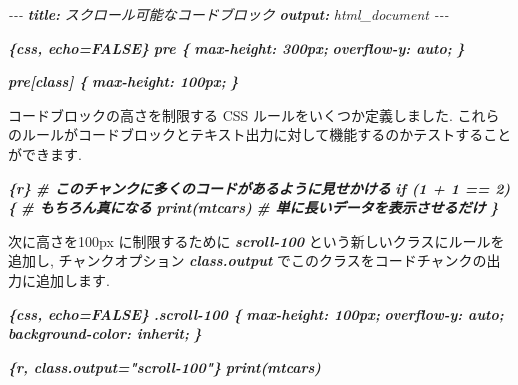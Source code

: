 \documentclass[
  11pt,
  lualatex,
  ja=standard]{bxjsreport}
\newenvironment{Shaded}{\begin{snugshade}}{\end{snugshade}}
\newcommand{\AnnotationTok}[1]{\textcolor[rgb]{0.56,0.35,0.01}{\textbf{\textit{#1}}}}
\newcommand{\CommentTok}[1]{\textcolor[rgb]{0.56,0.35,0.01}{\textit{#1}}}
\newcommand{\InformationTok}[1]{\textcolor[rgb]{0.56,0.35,0.01}{\textbf{\textit{#1}}}}
\newcommand{\NormalTok}[1]{#1}
\begin{document}
\begin{Shaded}
\begin{Highlighting}[]
\CommentTok{{-}{-}{-}}
\AnnotationTok{title:}\CommentTok{ スクロール可能なコードブロック}
\AnnotationTok{output:}\CommentTok{ html\_document}
\CommentTok{{-}{-}{-}}

\InformationTok{\textasciigrave{}\textasciigrave{}\textasciigrave{}\{css, echo=FALSE\}}
\InformationTok{pre \{}
\InformationTok{  max{-}height: 300px;}
\InformationTok{  overflow{-}y: auto;}
\InformationTok{\}}

\InformationTok{pre[class] \{}
\InformationTok{  max{-}height: 100px;}
\InformationTok{\}}
\InformationTok{\textasciigrave{}\textasciigrave{}\textasciigrave{}}

\NormalTok{コードブロックの高さを制限する CSS ルールをいくつか定義しました. これらのルールがコードブロックとテキスト出力に対して機能するのかテストすることができます.}

\InformationTok{\textasciigrave{}\textasciigrave{}\textasciigrave{}\{r\}}
\InformationTok{\# このチャンクに多くのコードがあるように見せかける}
\InformationTok{if (1 + 1 == 2) \{}
\InformationTok{  \# もちろん真になる}
\InformationTok{  print(mtcars)}
\InformationTok{  \# 単に長いデータを表示させるだけ}
\InformationTok{\}}
\InformationTok{\textasciigrave{}\textasciigrave{}\textasciigrave{}}

\NormalTok{次に高さを100px に制限するために }\InformationTok{\textasciigrave{}scroll{-}100\textasciigrave{}}\NormalTok{ という新しいクラスにルールを追加し,  チャンクオプション }\InformationTok{\textasciigrave{}class.output\textasciigrave{}}\NormalTok{ でこのクラスをコードチャンクの出力に追加します.}

\InformationTok{\textasciigrave{}\textasciigrave{}\textasciigrave{}\{css, echo=FALSE\}}
\InformationTok{.scroll{-}100 \{}
\InformationTok{  max{-}height: 100px;}
\InformationTok{  overflow{-}y: auto;}
\InformationTok{  background{-}color: inherit;}
\InformationTok{\}}
\InformationTok{\textasciigrave{}\textasciigrave{}\textasciigrave{}}

\InformationTok{\textasciigrave{}\textasciigrave{}\textasciigrave{}\{r, class.output="scroll{-}100"\}}
\InformationTok{print(mtcars)}
\InformationTok{\textasciigrave{}\textasciigrave{}\textasciigrave{}}
\end{Highlighting}
\end{Shaded}
\end{document}
